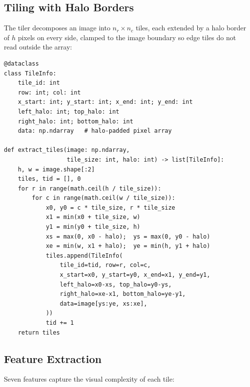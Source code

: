 \documentclass[12pt,a4paper]{article}
\begin{document}
\subsection{Tiling with Halo Borders}

The tiler decomposes an image into $n_r \times n_c$ tiles, each extended by a halo border of $h$ pixels on every side, clamped to the image boundary so edge tiles do not read outside the array:

\begin{lstlisting}[caption={Tile extraction with halo borders (\texttt{src/tiling.py}).}, label=lst:tiling]
@dataclass
class TileInfo:
    tile_id: int
    row: int; col: int
    x_start: int; y_start: int; x_end: int; y_end: int
    left_halo: int; top_halo: int
    right_halo: int; bottom_halo: int
    data: np.ndarray   # halo-padded pixel array

def extract_tiles(image: np.ndarray,
                  tile_size: int, halo: int) -> list[TileInfo]:
    h, w = image.shape[:2]
    tiles, tid = [], 0
    for r in range(math.ceil(h / tile_size)):
        for c in range(math.ceil(w / tile_size)):
            x0, y0 = c * tile_size, r * tile_size
            x1 = min(x0 + tile_size, w)
            y1 = min(y0 + tile_size, h)
            xs = max(0, x0 - halo);  ys = max(0, y0 - halo)
            xe = min(w, x1 + halo);  ye = min(h, y1 + halo)
            tiles.append(TileInfo(
                tile_id=tid, row=r, col=c,
                x_start=x0, y_start=y0, x_end=x1, y_end=y1,
                left_halo=x0-xs, top_halo=y0-ys,
                right_halo=xe-x1, bottom_halo=ye-y1,
                data=image[ys:ye, xs:xe],
            ))
            tid += 1
    return tiles
\end{lstlisting}

\subsection{Feature Extraction}

Seven features capture the visual complexity of each tile:
\end{document}
